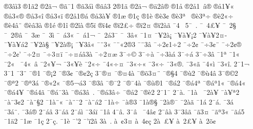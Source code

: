 {^^ae3^^e2^^ec3
^^ae1^^e32
^^ae2^^e3^^ac
^^ae^^e3^^af1
^^ae^^e33^^e1^^ec
^^ae^^e3^^e23
2^^ae1^^e4
^^ae2^^e4^^ac
^^ae^^e42^^e2^^ae
^^ae1^^e5
^^ae2^^e51^^a0^^e2^^ae
^^ae^^e51^^a5^^ab
^^ae^^e53^^ab^^ae
^^ae^^e53^^ab^^ee
^^ae^^e53^^ab^^ef
^^ae2^^e51^^ae^^e1
^^ae^^e53^^e0^^a5
^^ae1^^e6
^^ae1^^e7
^^ae1^^e8
^^ae^^e83^^a2
^^ae^^e83^^aa^^a0
^^ae^^e83^^aa^^f7
^^ae^^e82^^ab^^f7
^^ae^^e84^^e2^^a8
^^ae^^e8^^e23^^e0
^^ae1^^e9
^^ae1^^ee
^^ae2^^ee^^e0
^^ae5^^ef
^^ae^^ef4^^a2
^^ae^^ef2^^a3^^f7
^^ae^^ef2^^a4
^^ae^^ef2^^e0^^e3
^^af4^^a0
5^^af^^a0.
^^af^^a04^^ad^^a3^^a5
^^af^^a02^^ad^^a7
^^af^^a02^^ad^^ae^^e2
^^af^^a03^^ad^^e6
^^af^^a03^^ad^^ec
^^af^^a0^^e13^^ab
^^af^^a0^^e11^^ac
^^af^^a02^^e13^^af
^^af^^a03^^e2^^ab
^^af1^^a4
^^af^^a52^^e0^^a1
^^af^^a5^^e0^^a5^^a12
^^af^^a5^^e0^^a52^^a4^^ad
^^af^^a5^^e0^^a5^^e12
^^af^^a52^^e0^^a7
^^af^^a52^^e0^^ae^^a1
^^af^^a53^^e2^^ab
^^af^^a83^^ab
^^af^^a8^^ab2^^ae3
^^af^^a83^^e2
^^af^^f72^^a21^^f72
^^af^^f72^^a2^^ad
^^af^^f73^^a2^^ad^^a8
^^af^^f72^^a2^^ae
^^af^^f72^^a2'
^^af^^f72^^a4^^ad
^^af^^f73^^a4^^ad^^ef
^^af^^f7^^a4^^e1^^e23^^e0
^^af^^f72^^a4^^e6
3^^af^^f7^^a9
3^^af^^f7^^e0
^^af^^f73^^e0^^e1
3^^af^^f7^^e1
3^^af^^f73^^e2
^^af1^^aa
^^af1^^ab
^^af2^^ab^^a0
^^af4^^ab^^a0^^e2
^^af2^^ab^^a5^^ac
^^af3^^ab^^a5^^e8
^^af2^^ab^^f7
^^af4^^ab^^f7^^a4
^^af3^^ab^^f7^^ab
^^af3^^ab^^f7^^ad
^^af3^^ab^^ae.
^^af3^^ab^^e3
^^af4^^ab^^ec
^^af3^^ab^^ee.
2^^af1^^ac
3^^af1^^ad
^^af3^^ad^^a8
^^af^^ae1
^^af^^ae^^a12
^^af^^ae3^^a2
^^af^^ae^^a22^^e7
3^^af^^ae^^a4
^^af^^ae^^a44^^e0
^^af^^ae^^f53^^a4^^a8
^^af^^ae^^a74
^^af^^ae^^f92
^^af^^ae^^f94^^e2
3^^af^^ae^^a92
^^af^^ae^^aa2
^^af^^ae^^aa3^^e1
^^af^^ae^^ab2^^ab
^^af^^ae5^^ac^^e13
^^af^^ae3^^ad^^e2
^^af^^ae^^af2
^^af^^ae^^af4^^e0
^^af^^ae^^e0^^ae1
^^af^^ae^^e12
^^af^^ae^^e14^^aa
^^af^^ae^^e1^^aa1^^ab
^^af^^ae^^e14^^ab^^a0
^^af^^ae^^e14^^ad^^a5
^^af^^ae^^e14^^ad^^e3
^^af^^ae^^e1^^af3^^e0
^^af^^ae^^e13^^e2^^a0.
^^af^^ae^^e13^^e2^^f7
^^af^^ae^^e52
^^af^^ae^^e82
2^^af1^^af
2^^af^^e0.
^^af1^^e0^^a0^^ad
^^af2^^e0^^a5
^^af^^e0^^a5^^aa2
^^af^^e0^^a83^^a22
^^af^^e0^^a8^^a72
^^af1^^e0^^a8^^ab
^^af^^e0^^a8^^af2
^^af^^e0^^a8^^e12
^^af1^^e0^^f7
^^af^^e0^^ae3
^^af1^^e0^^ae^^a7
^^af2^^e0^^ae^^af
^^af2^^e0^^e3
^^af1^^e1
2^^af^^e1.
^^af3^^e1^^a0
^^af3^^e1^^a8.
^^af3^^e1^^ae
2^^af^^e1^^e2
3^^af^^e1^^e3
2^^af^^e1^^ec
^^af3^^e1^^ef
^^af1^^e2
4^^af^^e2.
3^^af^^e2^^a0
^^af4^^e2^^a2
2^^af^^e2^^e0
3^^af3^^e2^^e3
^^af^^e33^^a4
^^af^^e3^^aa3^^ab
^^af^^e3^^e15
^^af1^^e42
^^af1^^e6
^^af1^^e7
2^^af^^e7.
^^af1^^e8
^^af'2
^^af'^^ef2^^e2^^ad
3^^e0^^a0.
^^e0^^a0^^a23^^a4
^^e0^^a04^^a2^^e7
2^^e0^^a0^^a3^^a5
^^e0^^a02^^a3^^a5^^ad
^^e0^^a02^^f5^^a2
}
